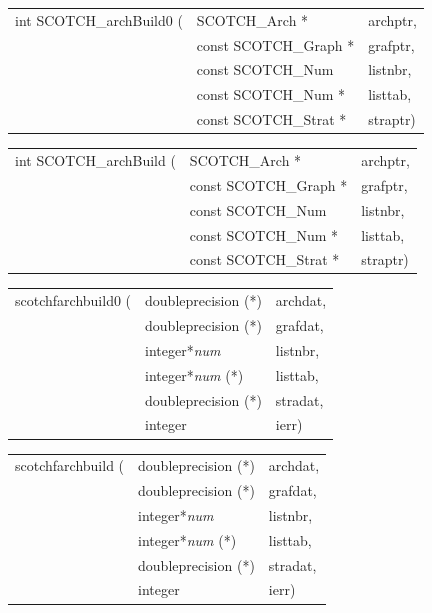 \begin{itemize}
\progsyn

{\tt\begin{tabular}{l@{}ll}
int SCOTCH\_archBuild0 ( & SCOTCH\_Arch *        & archptr, \\
                         & const SCOTCH\_Graph * & grafptr, \\
                         & const SCOTCH\_Num     & listnbr, \\
                         & const SCOTCH\_Num *   & listtab, \\
                         & const SCOTCH\_Strat * & straptr) \\
\end{tabular}}

{\tt\begin{tabular}{l@{}ll}
int SCOTCH\_archBuild ( & SCOTCH\_Arch *        & archptr, \\
                        & const SCOTCH\_Graph * & grafptr, \\
                        & const SCOTCH\_Num     & listnbr, \\
                        & const SCOTCH\_Num *   & listtab, \\
                        & const SCOTCH\_Strat * & straptr)
\end{tabular}}

{\tt\begin{tabular}{l@{}ll}
scotchfarchbuild0 ( & doubleprecision (*)   & archdat, \\
                    & doubleprecision (*)   & grafdat, \\
                    & integer*{\it num}     & listnbr, \\
                    & integer*{\it num} (*) & listtab, \\
                    & doubleprecision (*)   & stradat, \\
                    & integer               & ierr)    \\
\end{tabular}}

{\tt\begin{tabular}{l@{}ll}
scotchfarchbuild ( & doubleprecision (*)   & archdat, \\
                   & doubleprecision (*)   & grafdat, \\
                   & integer*{\it num}     & listnbr, \\
                   & integer*{\it num} (*) & listtab, \\
                   & doubleprecision (*)   & stradat, \\
                   & integer               & ierr)
\end{tabular}}


\end{itemize}

